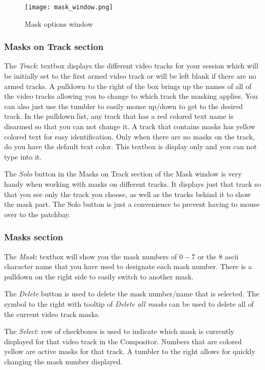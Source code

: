 \begin{figure}[htpb]
    \centering
    \texttt{[image: mask\_window.png]}
    \caption{Mask options window}
    \label{fig:mask_window}
\end{figure}

\subsubsection*{Masks on Track section}%
\label{ssub:masks_track_section}

The \textit{Track}: textbox displays the different video tracks for your session which will be initially set to the first armed video track or will be left blank if there are no armed tracks.  A pulldown to the right of the box brings up the names of all of the video tracks allowing you to change to which track the masking applies.  You can also just use the tumbler to easily mouse up/down to get to the desired track. In the pulldown list, any track that has a red colored text name is disarmed so that you can not change it.  A track that contains masks has yellow colored text for easy identification.  Only when there are no masks on the track, do you have the default text color. This textbox is display only and you can not type into it.

The \textit{Solo} button in the Masks on Track section of the Mask window is very handy when working with masks on different tracks.  It displays just that track so that you see only the track you choose, as well as the tracks behind it to show the mask part.  The Solo button is just a convenience to prevent having to mouse over to the patchbay.

\subsubsection*{Masks section}%
\label{ssub:masks_section}

The \textit{Mask}: textbox will show you the mask numbers of $0-7$ or the 8 ascii character name that you have used to designate each mask number.  There is a pulldown on the right side to easily switch to another mask. 

The \textit{Delete} button is used to delete the mask number/name that is selected. The symbol to the right with tooltip of \textit{Delete all masks} can be used to delete all of the current video track masks.

The \textit{Select}: row of checkboxes is used to indicate which mask is currently displayed for that video track in the Compositor.  Numbers that are colored yellow are active masks for that track.  A tumbler to the right allows for quickly changing the mask number displayed.

